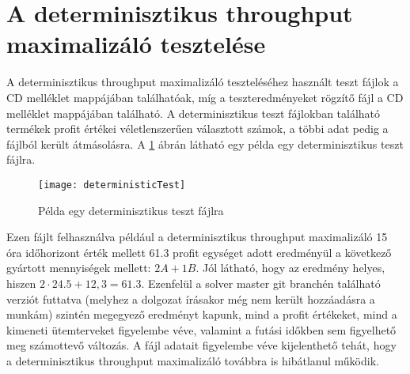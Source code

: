 \section{A determinisztikus throughput maximalizáló tesztelése}
A determinisztikus throughput maximalizáló teszteléséhez használt teszt fájlok a CD melléklet   mappájában találhatóak, míg a teszteredményeket rögzítő  fájl a CD melléklet  mappájában található.
A determinisztikus teszt fájlokban található termékek profit értékei véletlenszerűen választott számok, a többi adat pedig a  fájlból került átmásolásra.
A \ref{deterministic_test} ábrán látható egy példa egy determinisztikus teszt fájlra.
\begin{figure}[H]
\begin{center}
\texttt{[image: deterministicTest]}
\caption{Példa egy determinisztikus teszt fájlra}
\label{deterministic_test}
\end{center}
\end{figure}
Ezen fájlt felhasználva például a determinisztikus throughput maximalizáló 15 óra időhorizont érték mellett 61.3 profit egységet adott eredményül a következő gyártott mennyiségek mellett: $2A+1B$.
Jól látható, hogy az eredmény helyes, hiszen $2 \cdot 24.5 +12,3=61.3$.
Ezenfelül a solver master git branchén található verziót futtatva (melyhez a dolgozat írásakor még nem került hozzáadásra a munkám) szintén megegyező eredményt kapunk, mind a profit értékeket, mind a kimeneti ütemterveket figyelembe véve, valamint a futási időkben sem figyelhető meg számottevő változás.
A  fájl adatait figyelembe véve kijelenthető tehát, hogy a determinisztikus throughput maximalizáló továbbra is hibátlanul működik.     
